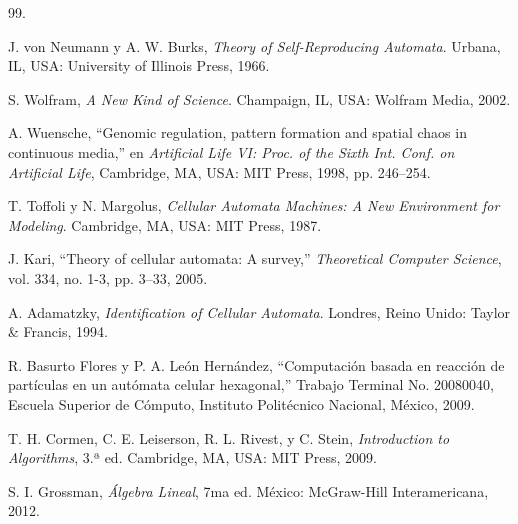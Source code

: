 %
%
% 
% 
%


\begin{thebibliography}{99.}%

J. von Neumann y A. W. Burks, \textit{Theory of Self-Reproducing Automata}. Urbana, IL, USA: University of Illinois Press, 1966.

S. Wolfram, \textit{A New Kind of Science}. Champaign, IL, USA: Wolfram Media, 2002.

A. Wuensche, ``Genomic regulation, pattern formation and spatial chaos in continuous media,'' en \textit{Artificial Life VI: Proc. of the Sixth Int. Conf. on Artificial Life}, Cambridge, MA, USA: MIT Press, 1998, pp. 246--254.

T. Toffoli y N. Margolus, \textit{Cellular Automata Machines: A New Environment for Modeling}. Cambridge, MA, USA: MIT Press, 1987.

J. Kari, ``Theory of cellular automata: A survey,'' \textit{Theoretical Computer Science}, vol. 334, no. 1-3, pp. 3--33, 2005.

A. Adamatzky, \textit{Identification of Cellular Automata}. Londres, Reino Unido: Taylor \& Francis, 1994.

R. Basurto Flores y P. A. León Hernández, ``Computación basada en reacción de partículas en un autómata celular hexagonal,'' Trabajo Terminal No. 20080040, Escuela Superior de Cómputo, Instituto Politécnico Nacional, México, 2009.

T. H. Cormen, C. E. Leiserson, R. L. Rivest, y C. Stein, \textit{Introduction to Algorithms}, 3.ª ed. Cambridge, MA, USA: MIT Press, 2009.

S. I. Grossman, \textit{Álgebra Lineal}, 7ma ed. México: McGraw-Hill Interamericana, 2012.

\end{thebibliography}
